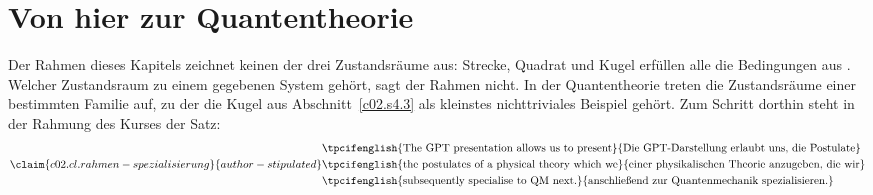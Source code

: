 \section{Von hier zur Quantentheorie}\label{c02.s8}

Der Rahmen dieses Kapitels zeichnet keinen der drei Zustandsräume aus: Strecke, Quadrat und
Kugel erfüllen alle die Bedingungen aus . Welcher Zustandsraum zu einem
gegebenen System gehört, sagt der Rahmen nicht. In der Quantentheorie treten die
Zustandsräume einer bestimmten Familie auf, zu der die Kugel aus
Abschnitt~\ref{c02.s4.3} als kleinstes nichttriviales Beispiel gehört. Zum Schritt dorthin
steht in der Rahmung des Kurses der Satz:
\begin{equation}\label{c02.eq.rahmen-spezialisierung}\claim{c02.cl.rahmen-spezialisierung}{author-stipulated}
  \begin{aligned}
    &\text{\tpcifenglish{The GPT presentation allows us to present}{Die GPT-Darstellung erlaubt uns, die Postulate}} \\
    &\text{\tpcifenglish{the postulates of a physical theory which we}{einer physikalischen Theorie anzugeben, die wir}} \\
    &\text{\tpcifenglish{subsequently specialise to QM next.}{anschließend zur Quantenmechanik spezialisieren.}}
  \end{aligned}
\end{equation}

